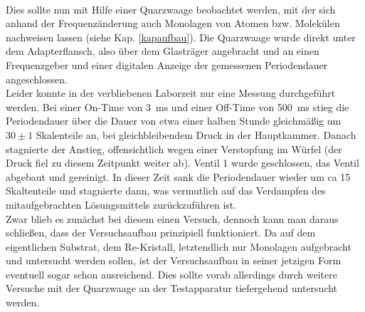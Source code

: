 \\
Dies sollte nun mit Hilfe einer Quarzwaage beobachtet werden, mit der sich anhand der
Frequenzänderung auch Monolagen von Atomen bzw. Molekülen nachweisen lassen (siehe Kap.
\ref{kapaufbau}). Die Quarzwaage wurde direkt unter dem Adapterflansch, also über dem Glasträger
angebracht und an einen Frequenzgeber und einer digitalen Anzeige der gemessenen Periodendauer
angeschlossen.
\\
Leider konnte in der verbliebenen Laborzeit nur eine Messung durchgeführt werden. Bei einer
On-Time von \SI{3}{ms} und einer Off-Time von \SI{500}{ms} stieg die Periodendauer über die Dauer
von etwa einer halben Stunde gleichmäßig um $30\pm1$ Skalenteile an, bei gleichbleibendem Druck in der
Hauptkammer. Danach stagnierte der Anstieg, offensichtlich wegen einer Verstopfung im Würfel (der
Druck fiel zu diesem Zeitpunkt weiter ab). Ventil 1 wurde geschlossen, das Ventil abgebaut und
gereinigt. In dieser Zeit sank die Periodendauer wieder um ca 15 Skaltenteile und stagnierte dann,
was vermutlich auf das Verdampfen des mitaufgebrachten Lösungsmittels zurückzuführen ist.
\\
Zwar blieb es zunächst bei diesem einen Versuch, dennoch kann man daraus schließen, dass der
Versuchsaufbau prinzipiell funktioniert. Da auf dem eigentlichen Substrat, dem Re-Kristall,
letztendlich nur Monolagen aufgebracht und untersucht werden sollen, ist der
Versuchsaufbau in seiner jetzigen Form eventuell sogar schon ausreichend. Dies sollte vorab
allerdings durch weitere Versuche mit der Quarzwaage an der Testapparatur tiefergehend untersucht
werden.


























